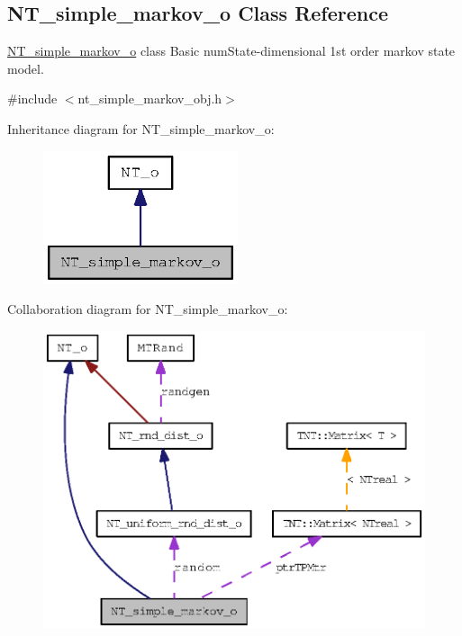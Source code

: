 \subsection{NT\_\-simple\_\-markov\_\-o Class Reference}
\label{class_n_t__simple__markov__o}


\hyperlink{class_n_t__simple__markov__o}{NT\_\-simple\_\-markov\_\-o} class Basic numState-\/dimensional 1st order markov state model.  




{\ttfamily \#include $<$nt\_\-simple\_\-markov\_\-obj.h$>$}



Inheritance diagram for NT\_\-simple\_\-markov\_\-o:
\nopagebreak
\begin{figure}[H]
\begin{center}
\leavevmode
\includegraphics[width=162pt]{class_n_t__simple__markov__o__inherit__graph}
\end{center}
\end{figure}


Collaboration diagram for NT\_\-simple\_\-markov\_\-o:
\nopagebreak
\begin{figure}[H]
\begin{center}
\leavevmode
\includegraphics[width=348pt]{class_n_t__simple__markov__o__coll__graph}
\end{center}
\end{figure}
